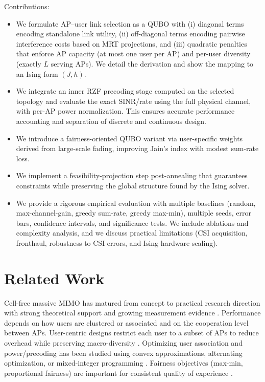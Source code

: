 Contributions:
\begin{itemize}
\item We formulate AP–user link selection as a QUBO with (i) diagonal terms encoding standalone link utility, (ii) off-diagonal terms encoding pairwise interference costs based on MRT projections, and (iii) quadratic penalties that enforce AP capacity (at most one user per AP) and per-user diversity (exactly $L$ serving APs). We detail the derivation and show the mapping to an Ising form $(J,h)$.
\item We integrate an inner RZF precoding stage computed on the selected topology and evaluate the exact SINR/rate using the full physical channel, with per-AP power normalization. This ensures accurate performance accounting and separation of discrete and continuous design.
\item We introduce a fairness-oriented QUBO variant via user-specific weights derived from large-scale fading, improving Jain’s index with modest sum-rate loss.
\item We implement a feasibility-projection step post-annealing that guarantees constraints while preserving the global structure found by the Ising solver.
\item We provide a rigorous empirical evaluation with multiple baselines (random, max-channel-gain, greedy sum-rate, greedy max-min), multiple seeds, error bars, confidence intervals, and significance tests. We include ablations and complexity analysis, and we discuss practical limitations (CSI acquisition, fronthaul, robustness to CSI errors, and Ising hardware scaling).
\end{itemize}

\section{Related Work}
Cell-free massive MIMO has matured from concept to practical research direction with strong theoretical support and growing measurement evidence \cite{ngo2017cell,demir2021foundations,bjornson2019massive}. Performance depends on how users are clustered or associated and on the cooperation level between APs. User-centric designs restrict each user to a subset of APs to reduce overhead while preserving macro-diversity \cite{buzzi2019user,chen2020structured}. Optimizing user association and power/precoding has been studied using convex approximations, alternating optimization, or mixed-integer programming \cite{nayebi2017precoding,bjornson2019making}. Fairness objectives (max-min, proportional fairness) are important for consistent quality of experience \cite{bashar2021max}.

